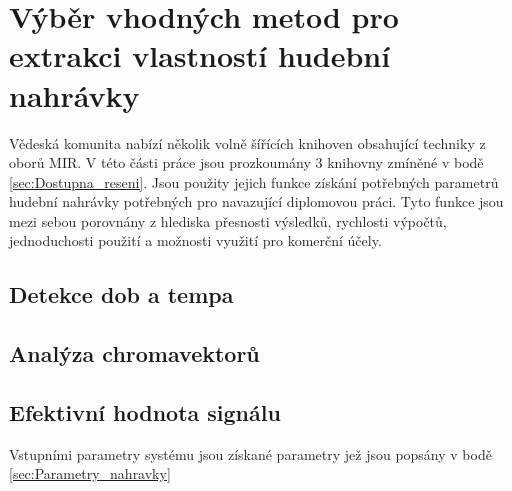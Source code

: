 

\section{Výběr vhodných metod pro extrakci vlastností hudební nahrávky} \label{sec:Exktrakce_vlastnosti_metody}

Vědeská komunita nabízí několik volně šířících knihoven obsahující techniky z oborů MIR. V této části práce jsou prozkoumány 3 knihovny zmíněné v bodě \ref{sec:Dostupna_reseni}. Jsou použity jejich funkce získání potřebných parametrů hudební nahrávky potřebných pro navazující diplomovou práci. Tyto funkce jsou mezi sebou porovnány z hlediska přesnosti výsledků, rychlosti výpočtů, jednoduchosti použití a možnosti využití pro komerční účely. 

\subsection{Detekce dob a tempa}

\subsection{Analýza chromavektorů}

\subsection{Efektivní hodnota signálu}


Vstupními parametry systému jsou získané parametry jež jsou popsány v bodě \ref{sec:Parametry_nahravky} 

